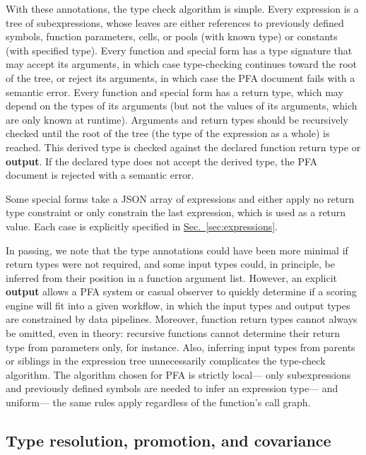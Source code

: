 \documentclass{article}
\newcommand{\PFAc}{\ttfamily\bfseries}
\theoremstyle{definition}
\begin{document}
With these annotations, the type check algorithm is simple.  Every expression is a tree of subexpressions, whose leaves are either references to previously defined symbols, function parameters, cells, or pools (with known type) or constants (with specified type).  Every function and special form has a type signature that may accept its arguments, in which case type-checking continues toward the root of the tree, or reject its arguments, in which case the PFA document fails with a semantic error.  Every function and special form has a return type, which may depend on the types of its arguments (but not the values of its arguments, which are only known at runtime).  Arguments and return types should be recursively checked until the root of the tree (the type of the expression as a whole) is reached.  This derived type is checked against the declared function return type or {\PFAc output}.  If the declared type does not accept the derived type, the PFA document is rejected with a semantic error.

Some special forms take a JSON array of expressions and either apply no return type constraint or only constrain the last expression, which is used as a return value.  Each case is explicitly specified in \hyperlink{hsec:expressions}{Sec.~\ref{sec:expressions}}.

In passing, we note that the type annotations could have been more minimal if return types were not required, and some input types could, in principle, be inferred from their position in a function argument list.  However, an explicit {\PFAc output} allows a PFA system or casual observer to quickly determine if a scoring engine will fit into a given workflow, in which the input types and output types are constrained by data pipelines.  Moreover, function return types cannot always be omitted, even in theory: recursive functions cannot determine their return type from parameters only, for instance.  Also, inferring input types from parents or siblings in the expression tree unnecessarily complicates the type-check algorithm.  The algorithm chosen for PFA is strictly local--- only subexpressions and previously defined symbols are needed to infer an expression type--- and uniform--- the same rules apply regardless of the function's call graph.

\subsection{Type resolution, promotion, and covariance}
\end{document}

